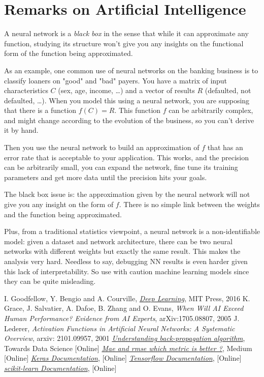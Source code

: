 \section{Remarks on Artificial Intelligence}

A neural network is a \emph{black box} in the sense that while it can approximate any function, studying its structure won't give you any insights on the functional form of the function being approximated.

As an example, one common use of neural networks on the banking business is to classify loaners on "good" and "bad" payers. You have a matrix of input characteristics $C$ (sex, age, income, \ldots) and a vector of results $R$ (defaulted, not defaulted, \ldots). When you model this using a neural network, you are supposing that there is a function $f(C)=R$. This function $f$ can be arbitrarily complex, and might change according to the evolution of the business, so you can't derive it by hand.

Then you use the neural network to build an approximation of $f$ that has an error rate that is acceptable to your application. This works, and the precision can be arbitrarily small, you can expand the network, fine tune its training parameters and get more data until the precision hits your goals.

The black box issue is: the approximation given by the neural network will not give you any insight on the form of $f$. There is no simple link between the weights and the function being approximated. 

Plus, from a traditional statistics viewpoint, a neural network is a non-identifiable model: given a dataset and network architecture, there can be two neural networks with different weights but exactly the same result. This makes the analysis very hard.
Needless to say, debugging NN results is even harder given this lack of interpretability. So use with caution machine learning models since they can be quite misleading.
 
\begin{thebibliography}{9}
 I. Goodfellow, Y. Bengio and A. Courville, \href{http://www.deeplearningbook.org}{\emph{Deep Learning}}, MIT Press, 2016
 K. Grace, J. Salvatier, A. Dafoe, B. Zhang and O. Evans, \emph{When Will AI Exceed Human Performance? Evidence from AI Experts}, arXiv:1705.08807, 2005
 J. Lederer, \emph{Activation Functions in Artificial Neural Networks: A Systematic Overview}, arxiv: 2101.09957, 2001
\href{https://towardsdatascience.com/understanding-backpropagation-algorithm-7bb3aa2f95fd}{\emph{Understanding back-propagation algorithm}}, Towards Data Science [Online]
\href{https://medium.com/human-in-a-machine-world/mae-and-rmse-which-metric-is-better-e60ac3bde13d}{\emph{Mae and rmse which metric is better ?}}, Medium [Online]
\href{https://keras.io/}{\emph{Keras Documentation}}, [Online]  
\href{https://www.tensorflow.org/}{\emph{Tensorflow Documentation}}, [Online] 
\href{https://scikit-learn.org/stable/}{\emph{scikit-learn Documentation}}, [Online]
\end{thebibliography}